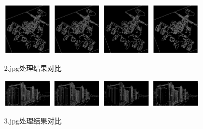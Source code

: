 \documentclass{article}
\begin{document}
\begin{figure}[h]
    \centering
    \includegraphics[width=0.22\textwidth]{./result/2_10_4}
    \includegraphics[width=0.22\textwidth]{./result/2_125_5}
    \includegraphics[width=0.22\textwidth]{./result/2_20_8}
    \includegraphics[width=0.22\textwidth]{./result/2_standard}
    \caption{2.jpg处理结果对比}
\end{figure}

\begin{figure}[h]
    \centering
    \includegraphics[width=0.22\textwidth]{./result/3_10_4}
    \includegraphics[width=0.22\textwidth]{./result/3_125_5}
    \includegraphics[width=0.22\textwidth]{./result/3_20_8}
    \includegraphics[width=0.22\textwidth]{./result/3_standard}
    \caption{3.jpg处理结果对比}
\end{figure}
\end{document}
